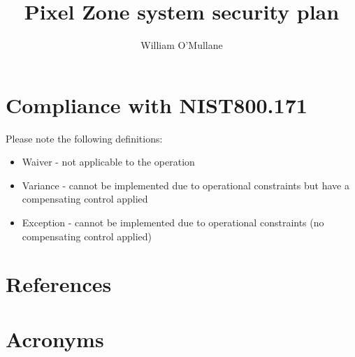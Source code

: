 \documentclass[OPS,authoryear,toc]{lsstdoc}
\title{Pixel Zone  system security plan}
\author{%
William O'Mullane
}
\date{\vcsDate}
\begin{document}
\maketitle



\appendix
\section{Compliance with NIST800.171} \label{sec:compliance}
Please note the following definitions:
\begin{itemize}
\item Waiver - not applicable to the operation
\item Variance - cannot be implemented due to operational constraints but have a compensating control applied
\item Exception - cannot be implemented due to operational constraints (no compensating control applied)
\end{itemize}


\section{References} \label{sec:bib}
\renewcommand{\refname}{} %


\section{Acronyms} \label{sec:acronyms}

\end{document}
